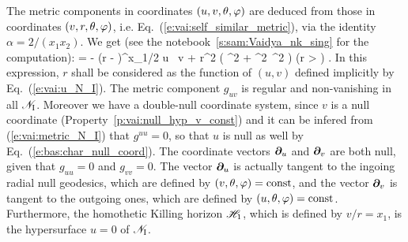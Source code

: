 The metric components in coordinates $(u, v, \theta, \varphi)$
are deduced from those in coordinates $(v, r, \theta, \varphi)$, i.e.
Eq.~(\ref{e:vai:self_similar_metric}), via
the identity $\alpha=2/(x_1 x_2)$. We get
(see the notebook~\ref{s:sam:Vaidya_nk_sing} for the computation):
\be \label{e:vai:metric_N_I}
     = -  \left(r -  \right)^{x_1/2}
        \dd u \, \dd v
        + r^2 \left( \dd\th^2 + \sin^2\th\, \dd\ph^2 \right) \qquad
        \left(r > \right) .
\ee
In this expression, $r$ shall be considered as the function of $(u,v)$ defined
implicitly by Eq.~(\ref{e:vai:u_N_I}).
The metric component $g_{uv}$ is regular and non-vanishing in all $\mathscr{N}_{\rm I}$.
Moreover we have a double-null coordinate system, since $v$ is a null coordinate
(Property~\ref{p:vai:null_hyp_v_const}) and it can be infered
from (\ref{e:vai:metric_N_I}) that $g^{uu} = 0$, so that
$u$ is null as well by Eq.~(\ref{e:bas:char_null_coord}).
The coordinate vectors $\bm{\partial}_u$ and $\bm{\partial}_v$ are both null, given that
$g_{uu} = 0$ and $g_{vv} = 0$. The vector $\bm{\partial}_u$ is actually tangent to the
ingoing radial null geodesics, which are defined by $(v,\theta,\varphi) = \mathrm{const}$,
and the vector $\bm{\partial}_v$ is tangent to the outgoing ones, which are defined
by $(u,\theta,\varphi) = \mathrm{const}$. Furthermore, the homothetic Killing horizon $\mathscr{H}_1$, which is defined by $v/r = x_1$, is the hypersurface
$u = 0$ of $\mathscr{N}_{\rm I}$.



